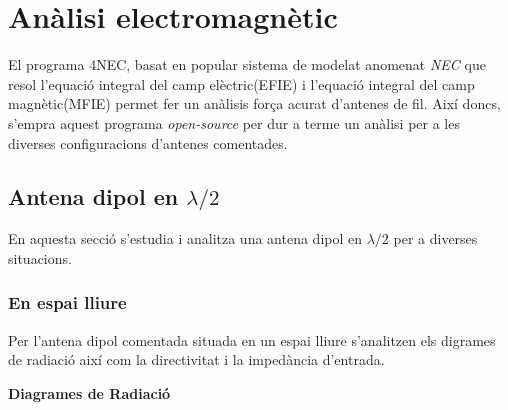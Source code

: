 \chapter{Anàlisi electromagnètic}

El programa 4NEC, basat en popular sistema de modelat anomenat \textit{NEC} que resol l'equació integral del camp elèctric(EFIE) i l'equació integral del camp magnètic(MFIE) permet fer un anàlisis força acurat d'antenes de fil. Així doncs, s'empra aquest programa \textit{open-source} per dur a terme un anàlisi per a  les diverses configuracions d'antenes comentades.

\section{Antena dipol en $\lambda/2$}

En aquesta secció s'estudia i analitza una antena dipol en $\lambda/2$ per a diverses situacions.

 \subsection{En espai lliure}

 Per l'antena dipol comentada situada en un espai lliure s'analitzen els digrames de radiació així com la directivitat i la impedància d'entrada.

 	\textbf{Diagrames de Radiació}

